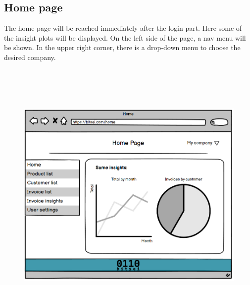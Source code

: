 \newpage
\subsection{Home page}
The home page will be reached immediately after the login part. Here some of the insight plots will be displayed. On the left side of the page, a nav menu will be shown. In the upper right corner, there is a drop-down menu to choose the desired company.
\begin{figure}[h!]
    \centering
    \includegraphics[height=380pt, keepaspectratio]{resources/mockup/Home.png}
\end{figure}


\newpage
